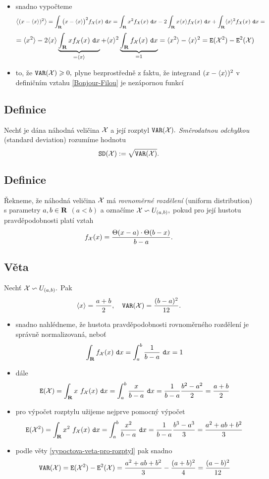 \Proof

\begin{itemize}
\item snadno vypo\v cteme $$ \left\langle (x-\langle x\rangle)^2 \right\rangle = \int_{{\mathbf R}} \bigl(x-\langle x\rangle\bigr)^2 f_{\mathcal X}(x)~\mathtt{d}x = \int_{{\mathbf R}} x^2 f_{\mathcal X}(x)~\mathtt{d}x - 2\int_{{\mathbf R}} x\langle x\rangle f_{\mathcal X}(x)~\mathtt{d}x + \int_{{\mathbf R}} \langle x\rangle^2 f_{\mathcal X}(x)~\mathtt{d}x = $$
$$=\langle x^2 \rangle - 2\langle x \rangle \underbrace{\int_{{\mathbf R}} x f_{\mathcal X}(x)~\mathtt{d}x}_{=\langle x \rangle} + \langle x \rangle^2 \underbrace{\int_{{\mathbf R}} f_{\mathcal X}(x)~\mathtt{d}x}_{=1} = \langle x^2 \rangle - \langle x \rangle^2 = \mathtt{E}({\mathcal X}^2)-\mathtt{E}^2({\mathcal X}) $$

\item to, \v ze $\mathtt{VAR}({\mathcal X}) \geqslant 0,$ plyne bezprost\v redn\v e z faktu, \v ze integrand $(x-\langle x\rangle)^2$ v defini\v cn\'im vztahu \eqref{Bonjour-Filou} je nez\'apornou funkc\'i

\end{itemize}


\subsection{Definice}
Nech\v t je d\'ana n\'ahodn\'a veli\v cina ${\mathcal X}$ a jej\'i rozptyl $\mathtt{VAR}({\mathcal X}).$ \emph{Směrodatnou odchylkou} (standard deviation) rozum\'ime hodnotu $$\mathtt{SD}({\mathcal X}) := \sqrt{\mathtt{VAR}({\mathcal X})}.$$

\subsection{Definice}
Řekneme, že náhodná veličina ${\mathcal X}$ má \emph{rovnoměrné rozdělení} (uniform distribution) s parametry $a, b \in {\mathbf R}$ $(a<b)$ a označíme  ${\mathcal X} \backsim U_{(a,b)},$ pokud pro jej\'i hustotu pravd\v epodobnosti plat\'i vztah $$ f_{\mathcal X}(x) = \frac{\Theta(x-a) \cdot \Theta(b-x)}{b-a}.$$

\subsection{V\v eta}
Nechť  ${\mathcal X} \backsim U_{(a,b)}.$ Pak $$\langle x \rangle = \dfrac{a+b}{2}, \quad \mathtt{VAR}({\mathcal X})=\dfrac{(b-a)^2}{12}.$$

\Proof

\begin{itemize}
\item snadno nahl\'edneme, \v ze hustota pravd\v epodobnosti rovnoměrného rozdělení je spr\'avn\v e normalizovan\'a, nebo\v t
%
$$\int_{\mathbf R} f_{\mathcal X}(x)~\mathtt{d}x=\int_a^b \frac{1}{b-a}~\mathtt{d}x=1 $$
\item d\'ale $$\mathtt{E}({\mathcal X}) = \int_{\mathbf R} x~f_{\mathcal X}(x)~\mathtt{d}x=\int_a^b \frac{x}{b-a}~\mathtt{d}x=\frac{1}{b-a}\frac{b^2-a^2}{2}=\dfrac{a+b}{2} $$
\item pro v\'ypo\v cet rozptylu u\v zijeme nejprve pomocn\'y v\'ypo\v cet $$\mathtt{E}({\mathcal X}^2) = \int_{\mathbf R} x^2~f_{\mathcal X}(x)~\mathtt{d}x=\int_a^b \frac{x^2}{b-a}~\mathtt{d}x=\frac{1}{b-a}\frac{b^3-a^3}{3}=\dfrac{a^2+ab+b^2}{3}$$
\item podle v\v ety \ref{vypoctova-veta-pro-rozptyl} pak snadno
%
$$\mathtt{VAR}({\mathcal X})=\mathtt{E}({\mathcal X}^2)-\mathtt{E}^2({\mathcal X})=\dfrac{a^2+ab+b^2}{3}-\dfrac{(a+b)^2}{4}=\dfrac{(a-b)^2}{12}$$
\end{itemize}

